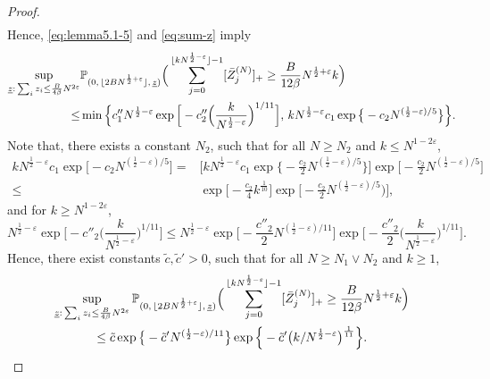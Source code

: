 \documentclass[11pt, reqno]{article}
\numberwithin{equation}{section}
\numberwithin{theorem}{section}
\begin{document}
\begin{appendix}
\begin{proof}
\begin{align}
\end{align}
Hence, \eqref{eq:lemma5.1-5} and \eqref{eq:sum-z} imply
\begin{align}\label{nex0}
    \sup_{\underline{z}: \, \sum_iz_i \leq \frac{B}{4\beta}N^{2\varepsilon}}&\mathbb{P}_{(0, \, \lfloor 2BN^{\frac{1}{2}+\varepsilon} \rfloor, \,\underline{z})}\Big(\sum_{j=0}^{\lfloor kN^{\frac{1}{2}-\varepsilon}\rfloor-1}[\Bar{Z}^{(N)}_j]_+\geq \frac{B}{12\beta}N^{\frac{1}{2}+\varepsilon}k\Big)\nonumber\\
    \leq& \min \Big\{c_1''N^{\frac{1}{2}-\varepsilon}\exp\Big[-c''_2\Big(\frac{k}{N^{\frac{1}{2}-\varepsilon}}\Big)^{1/11}\Big], \, kN^{\frac{1}{2}-\varepsilon}c_1\exp \big\{-c_2N^{(\frac{1}{2}-\varepsilon)/5}\big\}\Big\}.
\end{align}
Note that, there exists a constant $N_2$, such that for all $N\geq N_2$ and $k\leq N^{1-2\varepsilon}$,
\begin{align*}
    kN^{\frac{1}{2}-\varepsilon}c_1\exp \big[-c_2N^{(\frac{1}{2}-\varepsilon)/5}\big]
    =&\Big[kN^{\frac{1}{2}-\varepsilon}c_1\exp \big\{-\frac{c_2}{2}N^{(\frac{1}{2}-\varepsilon)/5}\big\}\Big]\exp \big[-\frac{c_2}{2}N^{(\frac{1}{2}-\varepsilon)/5}\big]\\
    \leq & \exp \big[-\frac{c_2}{4}k^{\frac{1}{10}}\big]\exp \big[-\frac{c_2}{2}N^{(\frac{1}{2}-\varepsilon)/5})\big],
\end{align*}
and for $k\geq N^{1-2\varepsilon}$,
$$
    N^{\frac{1}{2}-\varepsilon}\exp\Big[-c''_2\Big(\frac{k}{N^{\frac{1}{2}-\varepsilon}}\Big)^{1/11}\Big]
    \leq  N^{\frac{1}{2}-\varepsilon}\exp\Big[-\frac{c''_2}{2}N^{(\frac{1}{2}-\varepsilon)/11}\Big]\exp\Big[-\frac{c''_2}{2}\Big(\frac{k}{N^{\frac{1}{2}-\varepsilon}}\Big)^{1/11}\Big].
$$
Hence, there exist constants $\tilde{c}, \tilde{c}'>0$, such that for all $N\geq N_1\vee N_2$ and $k\geq 1$,
\begin{multline}\label{eq:sum-z-bar-plus}
    \sup_{\underline{z}: \, \sum_iz_i \leq \frac{B}{4\beta}N^{2\varepsilon}}\mathbb{P}_{(0, \, \lfloor 2BN^{\frac{1}{2}+\varepsilon} \rfloor, \,\underline{z})}\Big(\sum_{j=0}^{\lfloor kN^{\frac{1}{2}-\varepsilon}\rfloor-1}[\Bar{Z}^{(N)}_j]_+\geq \frac{B}{12\beta}N^{\frac{1}{2}+\varepsilon}k\Big)\\
    \leq \tilde{c}\exp \big\{-\tilde{c}'N^{(\frac{1}{2}-\varepsilon)/11}\big\}\exp \Big\{-\tilde{c}'\big(k/N^{\frac{1}{2}-\varepsilon}\big)^{\frac{1}{11}}\Big\}.

\end{multline}
\end{proof}
\end{appendix}
\end{document}
